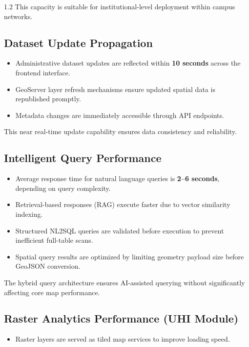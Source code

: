 \begin{spacing}{1.2}
This capacity is suitable for institutional-level deployment within campus networks.

\subsection*{Dataset Update Propagation}

\begin{itemize}
    \item Administrative dataset updates are reflected within \textbf{10 seconds}
    across the frontend interface.
    \item GeoServer layer refresh mechanisms ensure updated spatial data is
    republished promptly.
    \item Metadata changes are immediately accessible through API endpoints.
\end{itemize}

This near real-time update capability ensures data consistency and reliability.

\subsection*{Intelligent Query Performance}

\begin{itemize}
    \item Average response time for natural language queries is \textbf{2–6 seconds},
    depending on query complexity.
    
    \item Retrieval-based responses (RAG) execute faster due to vector similarity
    indexing.
    
    \item Structured NL2SQL queries are validated before execution to prevent
    inefficient full-table scans.
    
    \item Spatial query results are optimized by limiting geometry payload size
    before GeoJSON conversion.
\end{itemize}

The hybrid query architecture ensures AI-assisted querying without
significantly affecting core map performance.

\subsection*{Raster Analytics Performance (UHI Module)}

\begin{itemize}
    \item Raster layers are served as tiled map services to improve loading speed.
    

\end{itemize}
\end{spacing}
